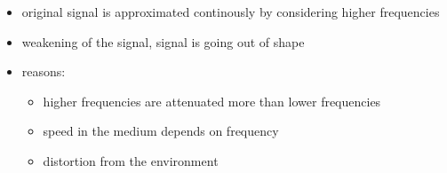 \documentclass[a4paper,12pt]{article}
\begin{document}
\begin{itemize}[itemsep=0pt]
	\item  original signal is approximated continously by considering higher frequencies
	\item  weakening of the signal, signal is going out of shape
	\item  reasons:
	\begin{itemize}[itemsep=0pt]
		\item  higher frequencies are attenuated more than lower frequencies
		\item  speed in the medium depends on frequency
		\item  distortion from the environment
	\end{itemize}
\end{itemize}
\end{document}

